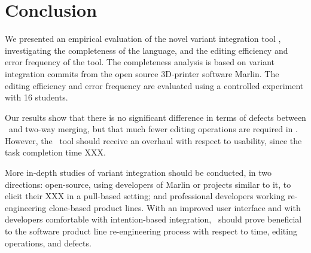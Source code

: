 \chapter{Conclusion}
We presented an empirical evaluation of the novel variant integration tool \tooln, investigating the completeness of the language, and the editing efficiency and error frequency of the tool. The completeness analysis is based on variant integration commits from the open source 3D-printer software Marlin. The editing efficiency and error frequency are evaluated using a controlled experiment with 16 students. 

Our results show that there is no significant difference in terms of defects between \tooln~and two-way merging, but that much fewer editing operations are required in \tooln. However, the \tooln~tool should receive an overhaul with respect to usability, since the task completion time XXX.

More in-depth studies of variant integration should be conducted, in two directions: open-source, using developers of Marlin or projects similar to it, to elicit their XXX in a pull-based setting; and professional developers working re-engineering clone-based product lines.
With an improved user interface and with developers comfortable with intention-based integration, \tooln~should prove beneficial to the software product line re-engineering process with respect to time, editing operations, and defects.


